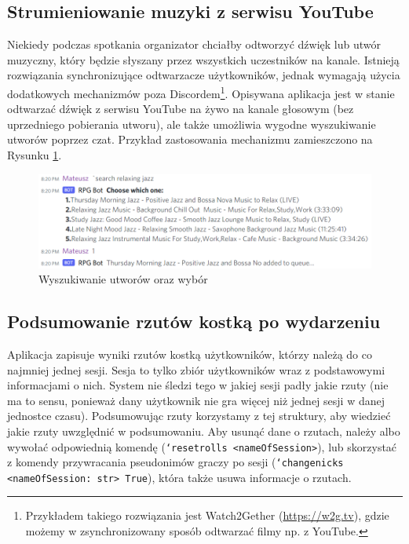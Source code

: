 \documentclass[shortabstract,inz]{iithesis}
\begin{document}
			\subsection{Strumieniowanie muzyki z serwisu YouTube}
			Niekiedy podczas spotkania organizator chciałby odtworzyć dźwięk lub utwór muzyczny, który będzie słyszany przez wszystkich uczestników na kanale. Istnieją rozwiązania synchronizujące odtwarzacze użytkowników, jednak wymagają użycia dodatkowych mechanizmów poza Discordem\footnote{Przykładem takiego rozwiązania jest Watch2Gether (\url{https://w2g.tv}), gdzie możemy w zsynchronizowany sposób odtwarzać filmy np. z YouTube.}. Opisywana aplikacja jest w stanie odtwarzać dźwięk z serwisu YouTube na żywo na kanale głosowym (bez uprzedniego pobierania utworu), ale także umożliwia wygodne wyszukiwanie utworów poprzez czat. Przykład zastosowania mechanizmu zamieszczono na Rysunku \ref{musicBotSearch}.
	
			\begin{figure}[h!]
					\includegraphics[width=1\textwidth]{musicExample}
					\caption{Wyszukiwanie utworów oraz wybór}
					\label{musicBotSearch}
			\end{figure}
	
			\subsection{Podsumowanie rzutów kostką po wydarzeniu}
			Aplikacja zapisuje wyniki rzutów kostką użytkowników, którzy należą do co najmniej jednej sesji. Sesja to tylko zbiór użytkowników wraz z podstawowymi informacjami o nich. System nie śledzi tego w jakiej sesji padły jakie rzuty (nie ma to sensu, ponieważ dany użytkownik nie gra więcej niż jednej sesji w danej jednostce czasu). Podsumowując rzuty korzystamy z tej struktury, aby wiedzieć jakie rzuty uwzględnić w podsumowaniu. Aby usunąć dane o rzutach, należy albo wywołać odpowiednią komendę (\texttt{`resetrolls <nameOfSession>}), lub skorzystać z komendy przywracania pseudonimów graczy po sesji (\texttt{`changenicks <nameOfSession: str> True}), która także usuwa informacje o rzutach.
			
\end{document}

